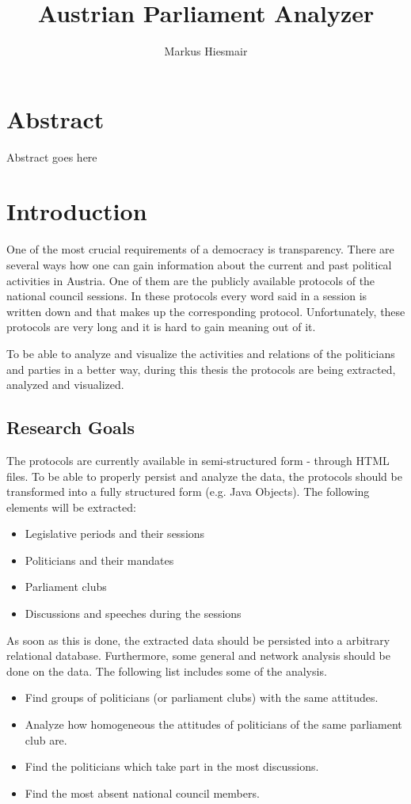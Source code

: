 \documentclass[12pt]{report}
\title{Austrian Parliament Analyzer}
\author{Markus Hiesmair}
\begin{document}
\maketitle
\newpage

\chapter*{Abstract}
Abstract goes here

\tableofcontents


\chapter{Introduction}
One of the most crucial requirements of a democracy is transparency. There are several ways how one can gain information about the current and past political activities in Austria. One of them are the publicly available protocols of the national council sessions. In these protocols every word said in a session is written down and that makes up the corresponding protocol. Unfortunately, these protocols are very long and it is hard to gain meaning out of it.

To be able to analyze and visualize the activities and relations of the politicians and parties in a better way, during this thesis the protocols are being extracted, analyzed and visualized. 

\section{Research Goals}
The protocols are currently available in semi-structured form - through HTML files. To be able to properly persist and analyze the data, the protocols should be transformed into a fully structured form (e.g. Java Objects). The following elements will be extracted:
\begin{itemize}
  \item Legislative periods and their sessions
  \item Politicians and their mandates
  \item Parliament clubs
  \item Discussions and speeches during the sessions
\end{itemize}

As soon as this is done, the extracted data should be persisted into a arbitrary relational database. Furthermore, some general and network analysis should be done on the data. The following list includes some of the analysis.
\begin{itemize}
  \item Find groups of politicians (or parliament clubs) with the same attitudes.
  \item Analyze how homogeneous the attitudes of politicians of the same parliament club are.
  \item Find the politicians which take part in the most discussions.
  \item Find the most absent national council members.
\end{itemize}
\end{document}
